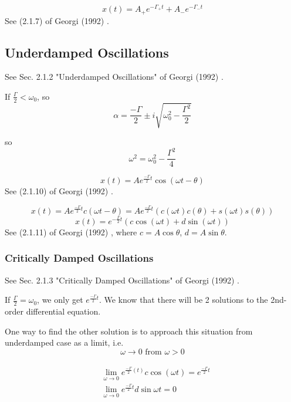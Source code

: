 \documentclass[10pt]{amsart}
\begin{document}
\begin{multicols*}{2}
\begin{equation}
	x(t) = A_+ e^{-\Gamma_+ t} + A_- e^{-\Gamma_- t}
\end{equation}
See (2.1.7) of Georgi (1992) \cite{Geor1992}.

\subsection{Underdamped Oscillations} See Sec. 2.1.2 "Underdamped Oscillations" of Georgi (1992) \cite{Geor1992}.

If $\frac{\Gamma}{2} < \omega_0$, so
\[
\alpha = \frac{-\Gamma }{2} \pm i \sqrt{ \omega_0^2 - \frac{\Gamma^2}{2} } 
\]

so 
\begin{equation}
	\omega^2 = \omega_0^2 - \frac{ \Gamma^2}{4}
\end{equation}

\begin{equation}
	x(t) = Ae^{\frac{-\Gamma}{2} t} \cos{ (\omega t- \theta)}
\end{equation}
See (2.1.10) of Georgi (1992) \cite{Geor1992}.

\[
x(t) = A e^{\frac{-\Gamma}{2} t} c(\omega t - \theta) = Ae^{\frac{-\Gamma}{2}t } (c(\omega t) c(\theta) + s(\omega t) s(\theta))
\]
\begin{equation}\label{Eq:UnderdampedOscillationsSolution}
	x(t) = e^{-\frac{\Gamma}{2}t} (c \cos{(\omega t)} + d\sin{(\omega t)})
\end{equation}
See (2.1.11) of Georgi (1992) \cite{Geor1992}, where $c= A\cos{\theta}$, $d=A\sin{\theta}$.

\subsubsection{Critically Damped Oscillations} See Sec. 2.1.3 "Critically Damped Oscillations" of Georgi (1992) \cite{Geor1992}.

If $\frac{\Gamma}{2} = \omega_0$, we only get $e^{\frac{-\Gamma}{2} t}$. We know that there will be 2 solutions to the 2nd-order differential equation.

One way to find the other solution is to approach this situation from underdamped case as a limit, i.e.
\[
\omega \to 0 \text{ from } \omega > 0
\]

\[
\begin{gathered}
	\begin{aligned}
		& \lim_{\omega \to 0} e^{ \frac{-\Gamma}{2}(t) } c\cos{(\omega t)} = e^{ \frac{-\Gamma}{2} t} \\
		& \lim_{\omega\to 0} e^{\frac{-\Gamma}{2} t} d \sin{\omega t} = 0
	\end{aligned}
\end{gathered}
\]


\end{multicols*}
\end{document}
